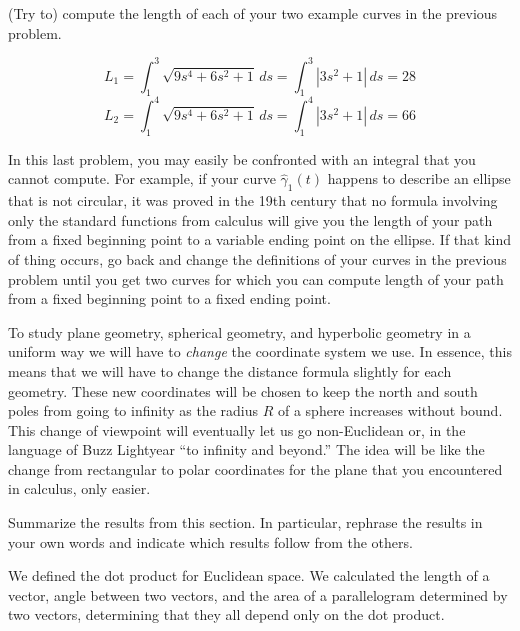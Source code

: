 \documentclass[newpage,hints,handout]{ximera}
\begin{document}
\begin{problem}
(Try to) compute the length of each of your two example curves in the previous
problem.

\begin{freeResponse}
\[
L_{1}= \int_{1}^{3}  \sqrt{9s^4 + 6s^2 +1} \,ds = \int_{1}^{3} |3s^2 +1| \, ds = 28
\]
\[
L_{2}= \int_{1}^{4}  \sqrt{9s^4 + 6s^2 +1} \,ds = \int_{1}^{4} |3s^2 +1| \, ds = 66
\]
\end{freeResponse}

\end{problem}
\nopagebreak
\begin{remark}
  In this last problem, you may easily be confronted with an integral that you
  cannot compute. For example, if your curve $\hat{\gamma}_{1}(t)$ happens to
  describe an ellipse that is not circular, it was proved in the 19th century
  that no formula involving only the standard functions from calculus will give
  you the length of your path from a fixed beginning point to a variable ending
  point on the ellipse. If that kind of thing occurs, go back and change the
  definitions of your curves in the previous problem until you get two
  curves for which you can compute length of your path from a fixed
  beginning point to a fixed ending point. %
\end{remark}





To study plane geometry, spherical geometry, and hyperbolic geometry in a
uniform way we will have to \textit{change} the coordinate system we use. In
essence, this means that we will have to change the distance formula slightly
for each geometry. These new coordinates will be chosen to keep the north and
south poles from going to infinity as the radius $R$ of a sphere increases
without bound. This change of viewpoint will eventually let us go non-Euclidean
or, in the language of Buzz Lightyear ``to infinity and beyond.'' The idea will
be like the change from rectangular to polar coordinates for the plane that you
encountered in calculus, only easier.


\begin{problem}
Summarize the results from this section. In particular, rephrase the results in your own words and indicate which
results follow from the others.
\begin{freeResponse}
We defined the dot product for Euclidean space. We calculated the length of a vector, angle between two vectors, and the area of a parallelogram determined by two vectors, determining that they all depend only on the dot product. 
\end{freeResponse}
\end{problem}
\end{document}
